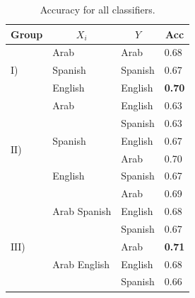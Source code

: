 \documentclass[runningheads]{llncs}
\begin{document}
\begin{table}[ht]
\centering
\caption{Accuracy for all classifiers.}
\label{results_accuracy}
\begin{tabular}{@{}llll@{}}
\toprule
\multicolumn{1}{c}{Group}        & \multicolumn{1}{c}{$X_i$} & \multicolumn{1}{c}{$Y$} & \multicolumn{1}{c}{Acc} \\ \midrule
\multirow{3}{*}{$\mathrm{I}$)}    & Arab                      & Arab                    & 0.68                         \\
                                 & Spanish                   & Spanish                 & 0.67                         \\
                                 & English                   & English                 & \textbf{0.70}                \\ \midrule
\multirow{6}{*}{$\mathrm{II}$)}   & Arab                      & English                 & 0.63                         \\
                                 &                           & Spanish                 & 0.63                         \\
                                 & Spanish                   & English                 & 0.67                         \\
                                 &                           & Arab                    & 0.70                         \\
                                 & English                   & Spanish                 & 0.67                         \\
                                 &                           & Arab                    & 0.69                         \\ \midrule
\multirow{12}{*}{$\mathrm{III}$)} & Arab Spanish              & English                 & 0.68                         \\
                                 &                           & Spanish                 & 0.67                         \\
                                 &                           & Arab                    & \textbf{0.71}                \\
                                 & Arab English              & English                 & 0.68                         \\
                                 &                           & Spanish                 & 0.66                         \\

\end{tabular}
\end{table}
\end{document}
